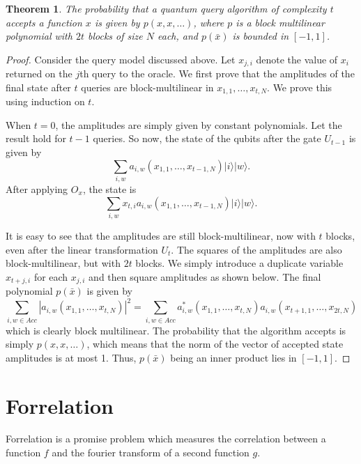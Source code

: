 \documentclass[12pt]{report}
\newtheorem{theorem}{Theorem}[section]
\begin{document}
\begin{theorem}
The probability that a quantum query algorithm of complexity $t$ accepts a function $x$ is given by $p(x, x, \ldots)$, where $p$ is a block multilinear polynomial with $2t$ blocks of size $N$ each, and $p(\bar{x})$ is bounded in $[-1,1]$.
\end{theorem}
\begin{proof}
Consider the query model discussed above. Let $x_{j,i}$ denote the value of $x_i$ returned on the $j$th query to the oracle. We first prove that the amplitudes of the final state after $t$ queries are block-multilinear in $x_{1,1}, \ldots, x_{t,N}$. We prove this using induction on $t$.

When $t=0$, the amplitudes are simply given by constant polynomials. Let the result hold for $t-1$ queries. So now, the state of the qubits after the gate $U_{t-1}$ is given by
$$\sum_{i,w} a_{i,w}(x_{1,1}, \ldots, x_{t-1,N}) |i\rangle |w\rangle.$$
After applying $O_x$, the state is
$$\sum_{i,w} x_{t,i} a_{i,w}(x_{1,1}, \ldots, x_{t-1,N}) |i\rangle |w\rangle.$$

It is easy to see that the amplitudes are still block-multilinear, now with $t$ blocks, even after the linear transformation $U_t$. The squares of the amplitudes are also block-multilinear, but with $2t$ blocks. We simply introduce a duplicate variable $x_{t+j,i}$ for each $x_{j,i}$ and then square amplitudes as shown below. The final polynomial $p(\bar{x})$ is given by
$$\sum_{i,w \in Acc} |a_{i,w}(x_{1,1}, \ldots, x_{t,N})|^2 = \sum_{i,w \in Acc} a^*_{i,w}(x_{1,1}, \ldots, x_{t,N}) a_{i,w}(x_{t+1,1}, \ldots, x_{2t,N})$$
which is clearly block multilinear. The probability that the algorithm accepts is simply $p(x, x, \ldots)$, which means that the norm of the vector of accepted state amplitudes is at most 1. Thus, $p(\bar{x})$ being an inner product lies in $[-1,1]$.
\end{proof}

\section{Forrelation}
Forrelation is a promise problem which measures the correlation between a function $f$ and the fourier transform of a second function $g$.
\end{document}
